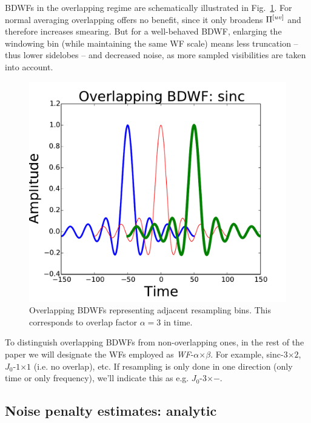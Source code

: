 \documentclass[useAMS,usenatbib]{mn2e}
\begin{document}
BDWFs in the overlapping regime are schematically illustrated in Fig.~\ref{fig:overlap}. For normal averaging 
overlapping offers no benefit, since it only broadens $\Pi^{[uv]}$ and therefore increases smearing. But for a well-behaved 
BDWF, enlarging the windowing bin (while maintaining the same WF scale) means less truncation -- thus lower 
sidelobes -- and decreased noise, as more sampled visibilities are taken into account.

\begin{figure} 
\includegraphics[width=\columnwidth]{./Figures/corrSigVLAMxBl_overlapGdelta.pdf}\caption{Overlapping 
BDWFs representing adjacent resampling bins. This corresponds to overlap factor $\alpha=3$ in time.}\label{fig:overlap}
\end{figure}

\newcommand{\WF}[3]{{#1}-$#2${}$\times${}$#3$}

To distinguish overlapping BDWFs from non-overlapping ones, in the rest of the paper we will designate the 
WFs employed as \WF{\em WF}{\alpha}{\beta}. For example, \WF{sinc}{3}{2}, \WF{$J_0$}{1}{1} (i.e. no overlap), etc.
If resampling is only done in one direction (only time or only frequency), we'll indicate this as e.g. \WF{$J_0$}{3}{-}.

\subsection{Noise penalty estimates: analytic}
\label{sec:imaging}
\end{document}
